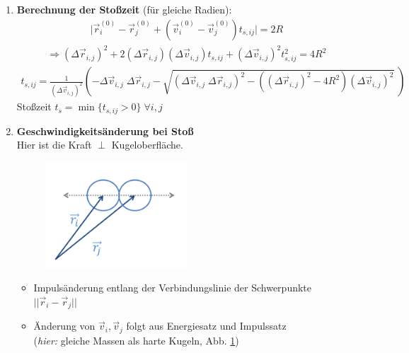 \documentclass[12pt]{article}
\begin{document}
\begin{enumerate}
\item \textbf{Berechnung der Stoßzeit} (für gleiche Radien): 
\begin{align*}
\vert \vec{r}_i^{(0)} - \vec{r}_j^{(0)} + \left( \vec{v}_i^{(0)} - \vec{v}_j^{(0)} \right) t_{s,ij}  \vert = 2 R 
\end{align*}
\begin{align*}
\Rightarrow (\Delta \vec{r}_{i,j})^2 + 2(\Delta \vec{r}_{i,j})( \Delta\vec{v}_{i,j}) t_{s,ij} + (\Delta \vec{v}_{i,j})^2 t_{s,ij}^2 = 4R^2 
\end{align*}
\begin{align*}
t_{s,ij} =
 \frac{1}{(\Delta \vec{v}_{i,j})^2} 
 \left( 
 - \Delta \vec{v}_{i,j} \; \Delta \vec{r}_{i,j} - \sqrt{( \Delta \vec{v}_{i,j} \; \Delta \vec{r}_{i,j})^2 - \left( (\Delta \vec{r}_{i,j})^2 - 4R^2\right) (\Delta \vec{v}_{i,j})^2} \; \right)
\end{align*}
Stoßzeit $t_s = \min \{ t_{s,ij} > 0\} \; \forall i,j$
\item \textbf{Geschwindigkeitsänderung bei Stoß} \\
Hier ist die Kraft $\perp$ Kugeloberfläche.

\begin{figure}[ht]
\centering
\includegraphics[width=0.5\textwidth]{Folie72.png}
	\caption{}
	\label{fig:Geschwindigkeitsaenderung}
\end{figure}

\begin{itemize}
\item Impulsänderung  entlang der Verbindungslinie der Schwerpunkte $|| \vec{r}_{i} - \vec{r}_{j} ||$
\item Änderung von $\vec{v}_{i}, \vec{v}_{j}$ folgt aus Energiesatz und Impulssatz \\
(\textit{hier:} gleiche Massen als harte Kugeln, Abb. \ref{fig:Geschwindigkeitsaenderung})\\ 


\end{itemize}
\end{enumerate}
\end{document}

